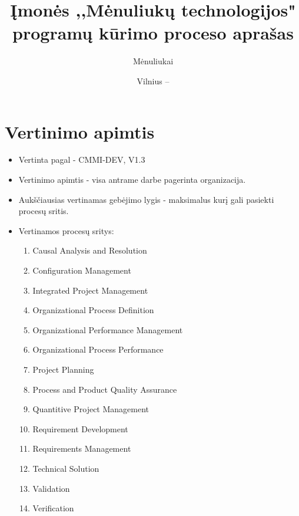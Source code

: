 \documentclass{VUMIFPSkursinis}
\title{Įmonės ,,Mėnuliukų technologijos" programų kūrimo proceso aprašas}
\author{Mėnuliukai}
\date{Vilnius – \the\year}
\begin{document}
\maketitle

\tableofcontents
	\section{Vertinimo apimtis}
		\begin{itemize}
			\item{Vertinta pagal - CMMI-DEV, V1.3}
			\item{Vertinimo apimtis - visa antrame darbe pagerinta organizacija.}
			\item{Aukščiausias vertinamas gebėjimo lygis - maksimalus kurį gali pasiekti procesų sritis.}
			\item{Vertinamos procesų sritys:
				\begin{enumerate}
					\item{Causal Analysis and Resolution}
					\item{Configuration Management}
					\item{Integrated Project Management}
					\item{Organizational Process Definition}
					\item{Organizational Performance Management}
					\item{Organizational Process Performance}
					\item{Project Planning}
					\item{Process and Product Quality Assurance}
					\item{Quantitive Project Management}
					\item{Requirement Development}
					\item{Requirements Management}
					\item{Technical Solution}
					\item{Validation}
					\item{Verification}
				\end{enumerate}
			}
		\end{itemize}
\end{document}
